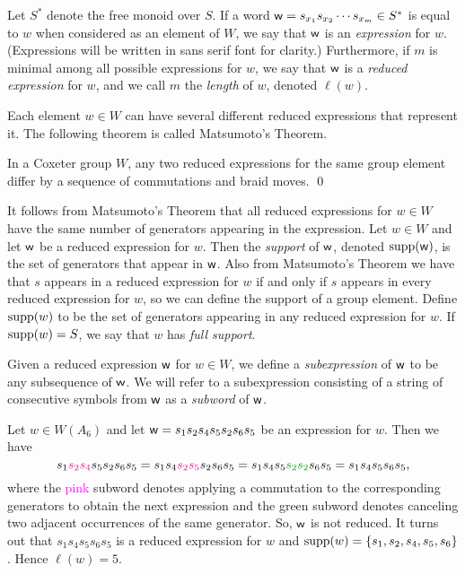\begin{definition} Let $S^*$ denote the free monoid over $S$. If a word $\mathsf{w}=s_{x_1}s_{x_2}\cdots s_{x_m}\in S^*$ is equal to $w$ when considered as an element of $W$, we say that $\mathsf{w}$ is an \emph{expression} for $w$.
    (Expressions will be written in {\sf sans serif} font for clarity.) Furthermore, if $m$ is minimal among all possible expressions for $w$, we say that $\mathsf{w}$ is a \emph{reduced expression} for $w$, and we call $m$ the \emph{length} of $w$, denoted $\ell(w)$.
\end{definition}

    Each element $w \in W$ can have several different reduced expressions that represent it.
    The following theorem is called Matsumoto's Theorem.

\begin{theorem} \label{thm:matsumoto} In a Coxeter group $W$, any two reduced expressions for the same group element differ by a sequence of commutations and braid moves. \qed
\end{theorem}

    It follows from Matsumoto's Theorem that all reduced expressions for $w \in W$ have the same number of generators appearing in the expression.
    Let $w \in W$ and let $\mathsf{w}$ be a reduced expression for $w$. Then the \emph{support} of $\mathsf{w}$, denoted $\operatorname{supp}(\mathsf{w})$, is the set of generators that appear in $\mathsf{w}$.
    Also from Matsumoto's Theorem we have that $s$ appears in a reduced expression for $w$ if and only if $s$ appears in every reduced expression for $w$, so we can define the support of a group element.
    Define $\operatorname{supp}(w)$ to be the set of generators appearing in any reduced expression for $w$.
    If $\operatorname{supp}(w) = S$, we say that $w$ has \emph{full support}.
    
    Given a reduced expression $\mathsf{w}$ for $w \in W$, we define a \emph{subexpression} of $\mathsf{w}$ to be any subsequence of $\mathsf{w}$. We will refer to a subexpression consisting of a string of consecutive symbols from $\mathsf{w}$ as a \emph{subword} of $\mathsf{w}$.

\begin{example}\label{ex:subword} Let $w \in W(A_6)$ and let $\mathsf{w} = s_1 s_2 s_4 s_5 s_2 s_6 s_5$ be an expression for $w$. Then we have $$s_1 \textcolor{magenta}{s_2 s_4} s_5 s_2 s_6 s_5
    = s_1 s_4 \textcolor{magenta}{s_2 s_5} s_2 s_6 s_5
    = s_1 s_4 s_5 \textcolor{ggreen}{s_2 s_2} s_6 s_5
    = s_1 s_4 s_5 s_6 s_5,$$
    where the \textcolor{magenta}{pink} subword denotes applying a commutation to the corresponding generators to obtain the next expression and the \textcolor{ggreen}{green} subword denotes canceling two adjacent occurrences of the same generator.
    So, $\mathsf{w}$ is not reduced. It turns out that $s_1 s_4 s_5 s_6 s_5$ is a reduced expression for $w$ and $\operatorname{supp}(w) = \{s_1,s_2,s_4,s_5,s_6\}$. Hence $\ell(w) = 5$.
\end{example}

